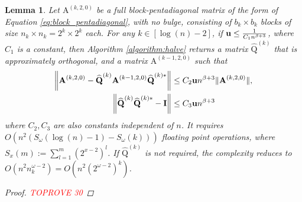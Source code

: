 \documentclass{article}
\newcommand{\lnorm}{\left\|}
\newcommand{\rnorm}{\right\|}
\newcommand{\lpar}{\left(}
\newcommand{\rpar}{\right)}
\newtheorem{lemma}{Lemma}[section]
\newcommand\matA{\boldsymbol{\mathrm{A}}}
\newcommand\matI{\boldsymbol{\mathrm{I}}}
\newcommand\matQhat{\widehat{\boldsymbol{\mathrm{Q}}}}
\newcommand{\umach}{\textbf{\textup{u}}}
\newcommand{\cmm}{\beta}
\begin{document}
\begin{lemma}
    \label{lemma:bandwidth_halving_floating_point_appendix}
    Let $\matA^{(k,2,0)}$ be a full block-pentadiagonal matrix of the form of Equation \eqref{eq:block_pentadiagonal}, with no bulge, consisting of $b_k\times b_k$ blocks of size $n_k\times n_k=2^{k}\times 2^{k}$ each. For any $k\in [\log(n)-2]$, if $\umach\leq \tfrac{1}{C_1n^{\cmm+3}}$, where $C_1$ is a constant, then Algorithm \ref{algorithm:halve} returns a matrix $\matQhat^{(k)}$ that is approximately orthogonal, and a matrix $\matA^{(k-1,2,0)}$ such that
    \begin{align*}
        \lnorm 
            \matA^{(k,2,0)} - \matQhat^{(k)}\matA^{(k-1,2,0)} \matQhat^{(k)*}
        \rnorm
        &\leq
        C_2\umach n^{\cmm+3}\|\matA^{(k,2,0)}\|,
        \\
        \lnorm 
            \matQhat^{(k)}\matQhat^{(k)*} - \matI
        \rnorm
        &\leq
        C_3\umach n^{\cmm+3}
    \end{align*}
    where $C_2,C_3$ are also constants independent of $n$. It requires 
    $O\lpar
        n^2
        \lpar 
            S_{\omega}(\log(n)-1)
            -
            S_{\omega}(k)
        \rpar
    \rpar$
    floating point operations, where $S_{x}(m):=\sum_{l=1}^{m} \lpar 2^{x-2} \rpar^{l}$. If $\matQhat^{(k)}$ is not required, the complexity reduces to 
    $O(n^2n_k^{\omega-2})=O(n^2(2^{\omega-2})^k)$.
    \begin{proof}\textcolor{red}{TOPROVE 30}\end{proof}
\end{lemma}
\end{document}
